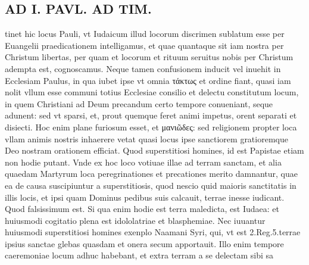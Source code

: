 \documentclass{article}
\begin{document}
\begin{pages}
\section*{AD I. PAVL. AD TIM. }
\marginpar{[ p.68 ]}\pstart tinet hic locus Pauli, vt Iudaicum illud locorum discrimen sublatum esse per Euangelii praedicationem intelligamus, et quae quantaque sit iam nostra per Christum libertas, per quam et locorum et rituum seruitus nobis per Christum adempta est, cognoscamus. Neque tamen confusionem inducit vel inuehit in Ecclesiam Paulus, in qua iubet ipse vt omnia τάκτως et ordine fiant, quasi iam nolit vllum esse communi totius Ecclesiae consilio et delectu constitutum locum, in quem Christiani ad Deum precandum certo tempore conueniant, seque adunent: sed vt sparsi, et, prout quemque feret animi impetus, orent separati et disiecti. Hoc enim plane furiosum esset, et μανιῶδες: sed religionem propter loca vllam animis nostris inhaerere vetat quasi locus ipse sanctiorem gratioremque Deo nostram orationem efficiat. Quod superstitiosi homines, id est Papistae etiam non hodie putant. Vnde ex hoc loco votiuae illae ad terram sanctam, et alia quaedam Martyrum loca peregrinationes et precationes merito damnantur, quae ea de causa suscipiuntur a superstitiosis, quod nescio quid maioris sanctitatis in illis locis, et ipsi quam Dominus pedibus suis calcauit, terrae inesse iudicant. Quod falsissimum est. Si qua enim hodie est terra maledicta, est Iudaea: et huiusmodi cogitatio plena est idololatriae et blasphemiae. Nec iuuantur huiusmodi superstitiosi homines exenplo Naamani Syri, qui, vt est 2.Reg.5.terrae ipsius sanctae glebas quasdam et onera secum apportauit. Illo enim tempore caeremoniae locum adhuc habebant, et extra terram a se delectam sibi sa\pend

\end{pages}
\end{document}
